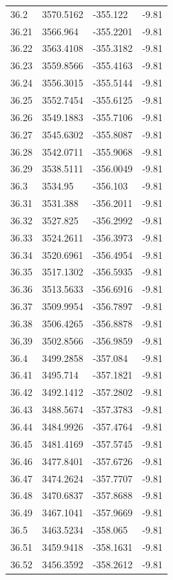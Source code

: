\begin{table}[H]
\begin{tabular}{llll}
36.2 & 3570.5162 & -355.122 & -9.81 \\
36.21 & 3566.964 & -355.2201 & -9.81 \\
36.22 & 3563.4108 & -355.3182 & -9.81 \\
36.23 & 3559.8566 & -355.4163 & -9.81 \\
36.24 & 3556.3015 & -355.5144 & -9.81 \\
36.25 & 3552.7454 & -355.6125 & -9.81 \\
36.26 & 3549.1883 & -355.7106 & -9.81 \\
36.27 & 3545.6302 & -355.8087 & -9.81 \\
36.28 & 3542.0711 & -355.9068 & -9.81 \\
36.29 & 3538.5111 & -356.0049 & -9.81 \\
36.3 & 3534.95 & -356.103 & -9.81 \\
36.31 & 3531.388 & -356.2011 & -9.81 \\
36.32 & 3527.825 & -356.2992 & -9.81 \\
36.33 & 3524.2611 & -356.3973 & -9.81 \\
36.34 & 3520.6961 & -356.4954 & -9.81 \\
36.35 & 3517.1302 & -356.5935 & -9.81 \\
36.36 & 3513.5633 & -356.6916 & -9.81 \\
36.37 & 3509.9954 & -356.7897 & -9.81 \\
36.38 & 3506.4265 & -356.8878 & -9.81 \\
36.39 & 3502.8566 & -356.9859 & -9.81 \\
36.4 & 3499.2858 & -357.084 & -9.81 \\
36.41 & 3495.714 & -357.1821 & -9.81 \\
36.42 & 3492.1412 & -357.2802 & -9.81 \\
36.43 & 3488.5674 & -357.3783 & -9.81 \\
36.44 & 3484.9926 & -357.4764 & -9.81 \\
36.45 & 3481.4169 & -357.5745 & -9.81 \\
36.46 & 3477.8401 & -357.6726 & -9.81 \\
36.47 & 3474.2624 & -357.7707 & -9.81 \\
36.48 & 3470.6837 & -357.8688 & -9.81 \\
36.49 & 3467.1041 & -357.9669 & -9.81 \\
36.5 & 3463.5234 & -358.065 & -9.81 \\
36.51 & 3459.9418 & -358.1631 & -9.81 \\
36.52 & 3456.3592 & -358.2612 & -9.81 \\

\end{tabular}
\end{table}
